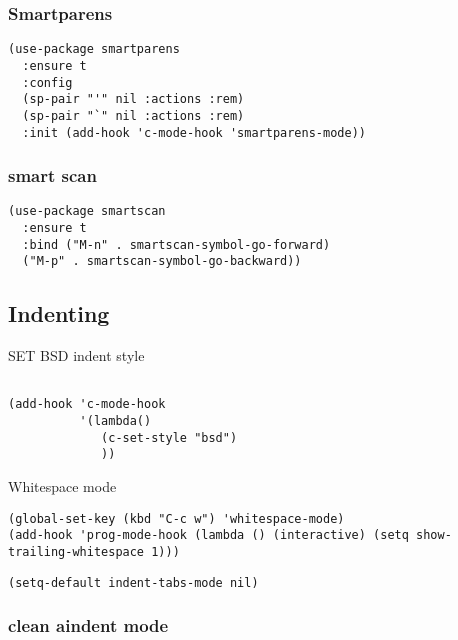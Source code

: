 \documentclass[12pt]{article}
\begin{document}
\subsubsection{Smartparens}
\label{sec:org90adffa}

\begin{verbatim}
(use-package smartparens
  :ensure t
  :config
  (sp-pair "'" nil :actions :rem)
  (sp-pair "`" nil :actions :rem)
  :init (add-hook 'c-mode-hook 'smartparens-mode))
\end{verbatim}

\subsubsection{smart scan}
\label{sec:orgaa3986c}

\begin{verbatim}
(use-package smartscan
  :ensure t
  :bind ("M-n" . smartscan-symbol-go-forward)
  ("M-p" . smartscan-symbol-go-backward))

\end{verbatim}

\subsection{Indenting}
\label{sec:org56dda6d}

SET BSD indent style

\begin{verbatim}

(add-hook 'c-mode-hook
          '(lambda()
             (c-set-style "bsd")
             ))
\end{verbatim}

Whitespace mode

\begin{verbatim}
(global-set-key (kbd "C-c w") 'whitespace-mode)
(add-hook 'prog-mode-hook (lambda () (interactive) (setq show-trailing-whitespace 1)))
\end{verbatim}

\begin{verbatim}
(setq-default indent-tabs-mode nil)
\end{verbatim}

\subsubsection{clean aindent mode}
\label{sec:org9590c9e}
\end{document}
